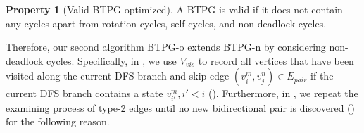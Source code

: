\documentclass[letterpaper]{article} %
\theoremstyle{definition}
\newtheorem{property}{Property}
\begin{document}
\begin{property}[Valid BTPG-optimized]\label{pro:BTPG-o}
A BTPG is valid if it does not contain any cycles apart from rotation cycles, self cycles, and non-deadlock cycles.
\end{property}

Therefore, our second algorithm BTPG-o extends BTPG-n by considering non-deadlock cycles. Specifically, in , we use $V_{vis}$ to record all vertices that have been visited along the current DFS branch and skip edge $(v_i^m, v_j^n) \in E_{pair}$ if the current DFS branch contains a state $v_{i'}^m, i'<i$ (). Furthermore, in , we repeat the examining process of type-2 edges until no new bidirectional pair is discovered () for the following reason.





\end{document}
